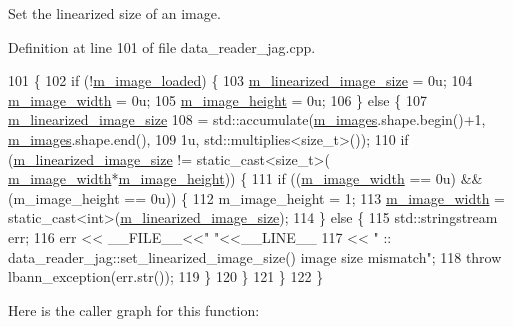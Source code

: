 Set the linearized size of an image. 



Definition at line 101 of file data\+\_\+reader\+\_\+jag.\+cpp.


\begin{DoxyCode}
101                                                 \{
102   \textcolor{keywordflow}{if} (!\hyperlink{classlbann_1_1data__reader__jag_a3f1691818996f73dc918dfd0e8f98a70}{m\_image\_loaded}) \{
103     \hyperlink{classlbann_1_1data__reader__jag_a7c2aa5f489e7c7a3236c1f6c4a760048}{m\_linearized\_image\_size} = 0u;
104     \hyperlink{classlbann_1_1data__reader__jag_a193a91f2aab9f6373a7b376ff183cd0e}{m\_image\_width} = 0u;
105     \hyperlink{classlbann_1_1data__reader__jag_a6178d5dffd5e9bf7cf5703613cf9bd2e}{m\_image\_height} = 0u;
106   \} \textcolor{keywordflow}{else} \{
107     \hyperlink{classlbann_1_1data__reader__jag_a7c2aa5f489e7c7a3236c1f6c4a760048}{m\_linearized\_image\_size}
108       = std::accumulate(\hyperlink{classlbann_1_1data__reader__jag_ae96696fb14653ef1b57936943eb6a800}{m\_images}.shape.begin()+1, \hyperlink{classlbann_1_1data__reader__jag_ae96696fb14653ef1b57936943eb6a800}{m\_images}.shape.end(),
109                         1u, std::multiplies<size\_t>());
110     \textcolor{keywordflow}{if} (\hyperlink{classlbann_1_1data__reader__jag_a7c2aa5f489e7c7a3236c1f6c4a760048}{m\_linearized\_image\_size} != static\_cast<size\_t>(
      \hyperlink{classlbann_1_1data__reader__jag_a193a91f2aab9f6373a7b376ff183cd0e}{m\_image\_width}*\hyperlink{classlbann_1_1data__reader__jag_a6178d5dffd5e9bf7cf5703613cf9bd2e}{m\_image\_height})) \{
111       \textcolor{keywordflow}{if} ((\hyperlink{classlbann_1_1data__reader__jag_a193a91f2aab9f6373a7b376ff183cd0e}{m\_image\_width} == 0u) && (m\_image\_height == 0u)) \{
112         m\_image\_height = 1;
113         \hyperlink{classlbann_1_1data__reader__jag_a193a91f2aab9f6373a7b376ff183cd0e}{m\_image\_width} = \textcolor{keyword}{static\_cast<}\textcolor{keywordtype}{int}\textcolor{keyword}{>}(\hyperlink{classlbann_1_1data__reader__jag_a7c2aa5f489e7c7a3236c1f6c4a760048}{m\_linearized\_image\_size});
114       \} \textcolor{keywordflow}{else} \{
115         std::stringstream err;
116         err << \_\_FILE\_\_<<\textcolor{stringliteral}{" "}<<\_\_LINE\_\_
117             << \textcolor{stringliteral}{" :: data\_reader\_jag::set\_linearized\_image\_size() image size mismatch"};
118         \textcolor{keywordflow}{throw} lbann\_exception(err.str());
119       \}
120     \}
121   \}
122 \}
\end{DoxyCode}
Here is the caller graph for this function\+:\nopagebreak
